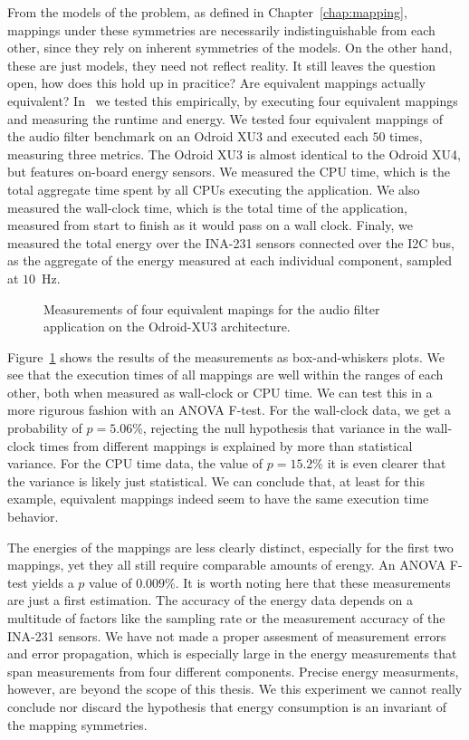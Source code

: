 From the models of the problem, as defined in Chapter~\ref{chap:mapping}, mappings under these symmetries are necessarily indistinguishable from each other, since they rely on inherent symmetries of the models.
On the other hand, these are just models, they need not reflect reality.
It still leaves the question open, how does this hold up in pracitice?
Are equivalent mappings actually equivalent?
In~\cite{goens_scopes17} we tested this empirically, by executing four equivalent mappings and measuring the runtime and energy.
We tested four equivalent mappings of the audio filter benchmark on an Odroid XU3 and executed each $50$ times, measuring three metrics.
The Odroid XU3 is almost identical to the Odroid XU4, but features on-board energy sensors.
We measured the \acs{CPU} time, which is the total aggregate time spent by all \acsp{CPU} executing the application.
We also measured the wall-clock time, which is the total time of the application, measured from start to finish as it would pass on a wall clock.
Finaly, we measured the total energy over the INA-231 sensors connected over the I2C bus, as the aggregate of the energy measured at each individual component, sampled at $10$~Hz.

\begin{figure}[h]
	\centering
\resizebox{0.95\textwidth}{!}{
     
 }
   \caption{Measurements of four equivalent mapings for the audio filter application on the Odroid-XU3 architecture.}
   \label{fig:symmetry_measurements}
\end{figure}

Figure~\ref{fig:symmetry_measurements} shows the results of the measurements as box-and-whiskers plots.
We see that the execution times of all mappings are well within the ranges of each other, both when measured as wall-clock or \ac{CPU} time.
We can test this in a more rigurous fashion with an \ac{ANOVA} F-test.
For the wall-clock data, we get a probability of $p = 5.06\%$, rejecting the null hypothesis that variance in the wall-clock times from different mappings is explained by more than statistical variance.
For the \ac{CPU} time data, the value of $p=15.2\%$ it is even clearer that the variance is likely just statistical.
We can conclude that, at least for this example, equivalent mappings indeed seem to have the same execution time behavior.

The energies of the mappings are less clearly distinct, especially for the first two mappings, yet they all still require comparable amounts of erengy.
An \ac{ANOVA} F-test yields a $p$ value of $0.009\%$.
It is worth noting here that these measurements are just a first estimation.
The accuracy of the energy data depends on a multitude of factors like the sampling rate or the measurement accuracy of the INA-231 sensors.
We have not made a proper assesment of measurement errors and error propagation, which is especially large in the energy measurements that span measurements from four different components.
Precise energy measurments, however, are beyond the scope of this thesis.
We this experiment we cannot really conclude nor discard the hypothesis that energy consumption is an invariant of the mapping symmetries.

